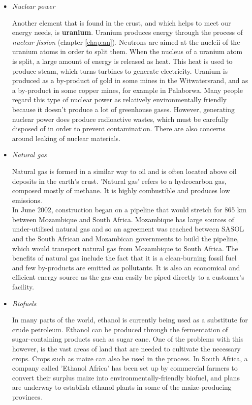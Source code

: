 \begin{itemize}

\item{\textit{Nuclear power}}

Another element that is found in the crust, and which helps to meet our energy needs, is \textbf{uranium}. Uranium produces energy through the process of \textit{nuclear fission} (chapter \ref{chap:an}). Neutrons are aimed at the nucleii of the uranium atoms in order to split them. When the nucleus of a uranium atom is split, a large amount of energy is released as heat. This heat is used to produce steam, which turns turbines to generate electricity. Uranium is produced as a by-product of gold in some mines in the Witwatersrand, and as a by-product in some copper mines, for example in Palaborwa. Many people regard this type of nuclear power as relatively environmentally friendly because it doesn't produce a lot of greenhouse gases. However, generating nuclear power does produce radioactive wastes, which must be carefully disposed of in order to prevent contamination. There are also concerns around leaking of nuclear materials.

\item{\textit{Natural gas}

Natural gas is formed in a similar way to oil and is often located above oil deposits in the earth's crust. 'Natural gas' refers to a hydrocarbon gas, composed mostly of methane. It is highly combustible and produces low emissions.\\

In June 2002, construction began on a pipeline that would stretch for 865 km between Mozambique and South Africa. Mozambique has large sources of under-utilised natural gas and so an agreement was reached between SASOL and the South African and Mozambican governments to build the pipeline, which would transport natural gas from Mozambique to South Africa. The benefits of natural gas include the fact that it is a clean-burning fossil fuel and few by-products are emitted as pollutants. It is also an economical and efficient energy source as the gas can easily be piped directly to a customer's facility.}

\item{\textit{Biofuels}

In many parts of the world, ethanol is currently being used as a substitute for crude petroleum. Ethanol can be produced through the fermentation of sugar-containing products such as sugar cane. One of the problems with this however, is the vast areas of land that are needed to cultivate the necessary crops. Crops such as maize can also be used in the process. 
In South Africa, a company called 'Ethanol Africa' has been set up by commercial farmers to convert their surplus maize into environmentally-friendly biofuel, and plans are underway to establish ethanol plants in some of the maize-producing provinces.}


\end{itemize}
